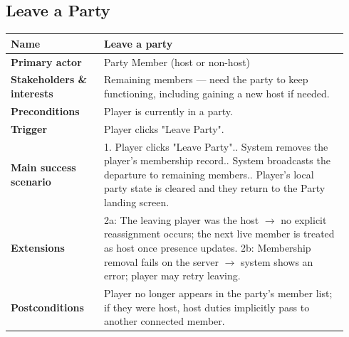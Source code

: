 \documentclass[sigconf]{acmart}
\begin{document}
\subsection*{Leave a Party}
{\footnotesize
\begin{supertabular}{@{}p{0.26\linewidth}p{0.68\linewidth}@{}}
\textbf{Name} & Leave a party \\
\hline
\textbf{Primary actor} & Party Member (host or non-host) \\
\hline
\textbf{Stakeholders \& interests} & Remaining members --- need the party to keep functioning, including gaining a new host if needed. \\
\hline
\textbf{Preconditions} & Player is currently in a party. \\
\hline
\textbf{Trigger} & Player clicks "Leave Party". \\
\hline
\textbf{Main success scenario} & 1. Player clicks "Leave Party".. System removes the player's membership record.. System broadcasts the departure to remaining members.. Player's local party state is cleared and they return to the Party landing screen. \\
\hline
\textbf{Extensions} & 2a: The leaving player was the host $\rightarrow$ no explicit reassignment occurs; the next live member is treated as host once presence updates.\newline
2b: Membership removal fails on the server $\rightarrow$ system shows an error; player may retry leaving. \\
\hline
\textbf{Postconditions} & Player no longer appears in the party's member list; if they were host, host duties implicitly pass to another connected member. \\
\end{supertabular}
}
\end{document}
